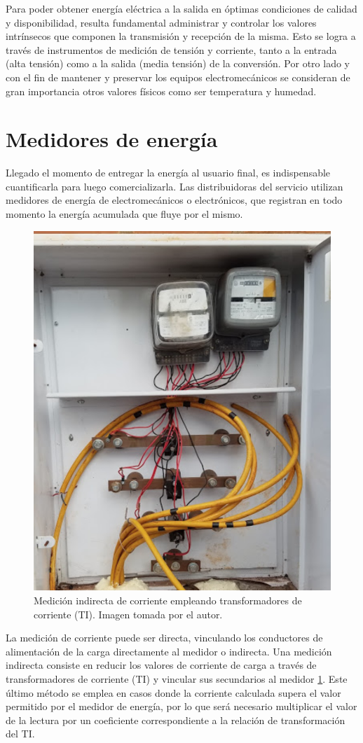 Para poder obtener energía eléctrica a la salida en óptimas condiciones de calidad y disponibilidad, resulta fundamental administrar y controlar los valores intrínsecos que componen la transmisión y recepción de la misma. Esto se logra a través de instrumentos de medición de tensión y corriente, tanto a la entrada (alta tensión) como a la salida (media tensión) de la conversión. Por otro lado y con el fin de mantener y preservar los equipos electromecánicos se consideran de gran importancia otros valores físicos como ser temperatura y humedad.\\

\section{Medidores de energía}
Llegado el momento de entregar la energía al usuario final, es indispensable cuantificarla para luego comercializarla. Las distribuidoras del servicio utilizan medidores de energía de electromecánicos o electrónicos, que registran en todo momento la energía acumulada que fluye por el mismo.\\
\begin{figure}
	\centering
	\includegraphics[width=0.5\linewidth]{Figures/Medicion_corriente_con_TI}
	\caption[]{Medición indirecta de corriente empleando transformadores de corriente (TI). Imagen tomada por el autor.}
	\label{fig:medicioncorrienteconti}
\end{figure}
La medición de corriente puede ser directa, vinculando los conductores de alimentación de la carga directamente al medidor o indirecta. Una medición indirecta consiste en reducir los valores de corriente de carga a través de transformadores de corriente (TI) y vincular sus secundarios al medidor \ref{fig:medicioncorrienteconti}. Este último método se emplea en casos donde la corriente calculada supera el valor permitido por el medidor de energía, por lo que será necesario multiplicar el valor de la lectura por un coeficiente correspondiente a la relación de transformación del TI.\\
